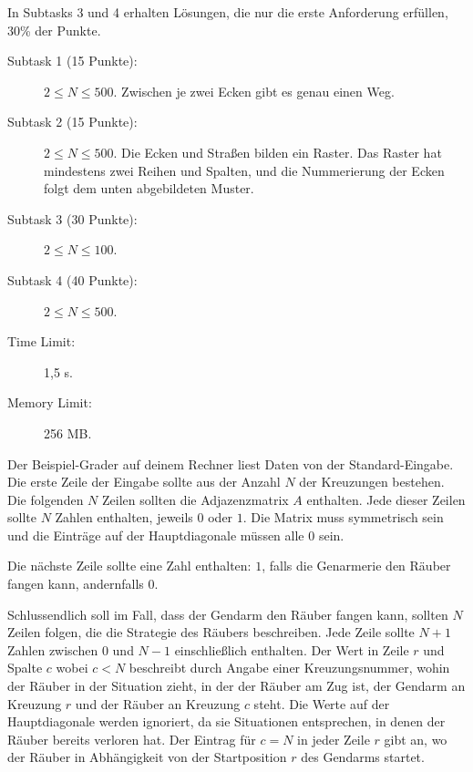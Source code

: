 \documentclass{boi2014-de}
\begin{document}
    In Subtasks 3 und 4 erhalten Lösungen, 
    die nur die erste Anforderung erfüllen, 30\% der Punkte.

    \begin{description}
        \item[Subtask 1 (15 Punkte):] $2 \le N \le 500$. 
        Zwischen je zwei Ecken gibt es genau einen Weg.
        \item[Subtask 2 (15 Punkte):] $2 \le N \le 500$. 
        Die Ecken und Straßen bilden ein Raster.  Das Raster hat mindestens zwei Reihen und Spalten,
        und die Nummerierung der Ecken folgt dem unten abgebildeten Muster.
        \begin{figure}[h!]
           \centering
        \end{figure}
        \item[Subtask 3 (30 Punkte):] $2 \le N \le 100$.
        \item[Subtask 4 (40 Punkte):] $2 \le N \le 500$.
    \end{description}

    \Constraints
    
    \begin{description}
        \item[Time Limit:] 1,5 s.
        \item[Memory Limit:] 256 MB.
    \end{description}

    \Experimentation
    Der Beispiel-Grader auf deinem Rechner liest Daten von der Standard-Eingabe.
    Die erste Zeile der Eingabe sollte aus der Anzahl $N$ der Kreuzungen bestehen.
    Die folgenden $N$ Zeilen sollten die Adjazenzmatrix $A$ enthalten.
    Jede dieser Zeilen sollte $N$ Zahlen enthalten, jeweils $0$ oder $1$.
    Die Matrix muss symmetrisch sein und die Einträge auf der Hauptdiagonale müssen alle $0$ sein.

    Die nächste Zeile sollte eine Zahl enthalten: $1$, falls die Genarmerie den Räuber fangen kann, andernfalls $0$.
    
    Schlussendlich soll im Fall, dass der Gendarm den Räuber fangen kann, sollten $N$ Zeilen folgen, die die Strategie des Räubers beschreiben. Jede Zeile sollte $N+1$ Zahlen zwischen $0$ und $N-1$ einschließlich enthalten. Der Wert in Zeile $r$ und Spalte $c$ wobei $c<N$ beschreibt durch Angabe einer Kreuzungsnummer, wohin der Räuber in der Situation zieht, in der der Räuber am Zug ist, der Gendarm an Kreuzung $r$ und der Räuber an Kreuzung $c$ steht. Die Werte auf der Hauptdiagonale werden ignoriert, da sie Situationen entsprechen, in denen der Räuber bereits verloren hat. Der Eintrag für $c=N$ in jeder Zeile $r$ gibt an, wo der Räuber in Abhängigkeit von der Startposition $r$ des Gendarms startet.
    
\end{document}

